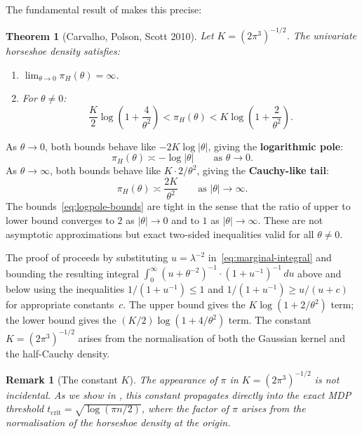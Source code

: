 \documentclass[12pt]{article}
\newtheorem{theorem}{Theorem}[section]
\newtheorem{remark}{Remark}[section]
\newcommand{\abs}[1]{\lvert #1 \rvert}
\newcommand{\piH}{\pi_H}
\newcommand{\tcrit}{t_{\mathrm{crit}}}
\begin{document}
The fundamental result of \citet{carvalho2010horseshoe} makes this precise:

\begin{theorem}[Carvalho, Polson, Scott 2010]\label{thm:cps}
Let $K = (2\pi^3)^{-1/2}$. The univariate horseshoe density satisfies:
\begin{enumerate}
  \item[(a)] $\lim_{\theta \to 0} \piH(\theta) = \infty$.
  \item[(b)] For $\theta \neq 0$:
  \begin{equation}\label{eq:logpole-bounds}
    \frac{K}{2} \log\!\left(1 + \frac{4}{\theta^2}\right)
    < \piH(\theta)
    < K \log\!\left(1 + \frac{2}{\theta^2}\right).
  \end{equation}
\end{enumerate}
\end{theorem}

As $\theta \to 0$, both bounds behave like $-2K\log\abs{\theta}$, giving the \textbf{logarithmic pole}:
\begin{equation}\label{eq:logpole}
  \piH(\theta) \asymp -\log\abs{\theta}
  \qquad \text{as } \theta \to 0.
\end{equation}
As $\theta \to \infty$, both bounds behave like $K \cdot 2/\theta^2$, giving the \textbf{Cauchy-like tail}:
\begin{equation}\label{eq:cauchy-tail}
  \piH(\theta) \asymp \frac{2K}{\theta^2}
  \qquad \text{as } \abs{\theta} \to \infty.
\end{equation}
The bounds~\eqref{eq:logpole-bounds} are tight in the sense that the ratio of upper to lower bound converges to $2$ as $\abs{\theta} \to 0$ and to $1$ as $\abs{\theta} \to \infty$. These are not asymptotic approximations but exact two-sided inequalities valid for all $\theta \neq 0$.

The proof of  proceeds by substituting $u = \lambda^{-2}$ in~\eqref{eq:marginal-integral} and bounding the resulting integral $\int_0^\infty (u + \theta^{-2})^{-1} \cdot (1 + u^{-1})^{-1}\, du$ above and below using the inequalities $1/(1+u^{-1}) \leq 1$ and $1/(1+u^{-1}) \geq u/(u + c)$ for appropriate constants~$c$. The upper bound gives the $K\log(1 + 2/\theta^2)$ term; the lower bound gives the $(K/2)\log(1 + 4/\theta^2)$ term. The constant $K = (2\pi^3)^{-1/2}$ arises from the normalisation of both the Gaussian kernel and the half-Cauchy density.

\begin{remark}[The constant $K$]\label{rem:constant-K}
The appearance of $\pi$ in $K = (2\pi^3)^{-1/2}$ is not incidental. As we show in , this constant propagates directly into the exact MDP threshold $\tcrit = \sqrt{\log(\pi n/2)}$, where the factor of $\pi$ arises from the normalisation of the horseshoe density at the origin.
\end{remark}
\end{document}
